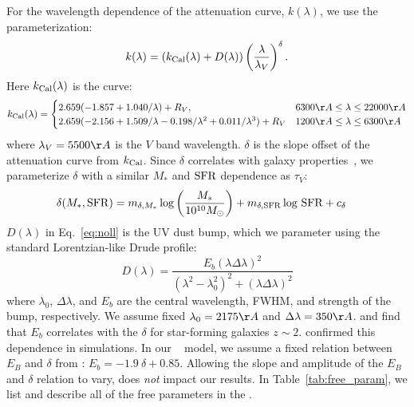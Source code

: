 For the wavelength dependence of the attenuation curve, $k(\lambda)$, we
use the \cite{noll2009} parameterization: 
\begin{equation} \label{eq:noll}
    k(\lambda) = \left(k_{\rm Cal}(\lambda) + D(\lambda)\right) \left(
    \frac{\lambda}{\lambda_V} \right)^\delta.
\end{equation}
Here $k_{\rm Cal}(\lambda)$ is the \cite{calzetti2001} curve: 
\[
    k_{\rm Cal}(\lambda) = 
    \begin{cases} 
        2.659 (-1.857 + 1.040/\lambda) + R_V, & 6300 \AA \le \lambda \le
        22000 \AA \\ 
        2.659 (-2.156 + 1.509/\lambda - 0.198/\lambda^2 + 0.011/\lambda^3) +
        R_V & 1200 \AA \le \lambda \le 6300 \AA
    \end{cases}
\]
where $\lambda_V = 5500 \AA$ is the $V$ band wavelength. $\delta$ is the slope
offset of the attenuation curve from $k_{\rm Cal}$. Since $\delta$ correlates 
with galaxy properties~\citep[\eg][]{leja2017, salim2018},
we parameterize $\delta$ with a similar $M_*$ and ${\rm SFR}$ dependence as
$\tau_V$:  
\begin{align} \label{eq:delta}
    \delta(M_*, {\rm SFR}) &= m_{\delta,M_*} \log \left(\frac{M_*}{10^{10}
    M_\odot}\right) + m_{\delta,{\rm SFR}} \log\,{\rm SFR} + c_\delta 
\end{align}
$D(\lambda)$ in Eq.~\ref{eq:noll} is the UV dust bump, which we parameter using
the standard Lorentzian-like Drude profile:
\begin{equation}
    D(\lambda) = \frac{E_b(\lambda \Delta \lambda)^2}{(\lambda^2 -
    \lambda_0^2)^2 + (\lambda \Delta \lambda)^2}
\end{equation}
where $\lambda_0$, $\Delta \lambda$, and $E_b$ are the central wavelength,
FWHM, and strength of the bump, respectively. We assume fixed $\lambda_0 = 2175
\AA$ and $\Delta \lambda = 350\AA$. \cite{kriek2013} and \cite{tress2018} find
that $E_b$ correlates with the $\delta$ for star-forming galaxies $z\sim2$.
\cite{narayanan2018} confirmed this dependence in simulations. In our \eda~
model, we assume a fixed relation between $E_B$ and $\delta$ from \cite{kriek2013}: 
$E_b = -1.9~\delta + 0.85$. Allowing the slope and amplitude of the $E_B$ and
$\delta$ relation to vary, does {\em not} impact our results.
In Table~\ref{tab:free_param}, we list and describe all of the free parameters
in the \eda. 

